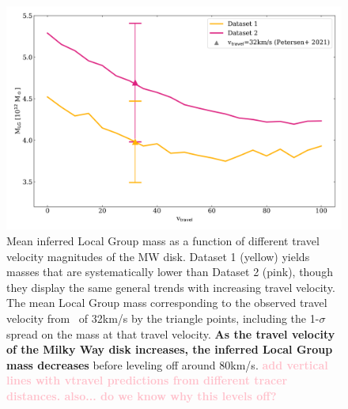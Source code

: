 \documentclass[twocolumn]{aastex631}
\newcommand{\kc}[1]{\textcolor{pink}{\textbf{#1}} }
\begin{document}
\begin{figure}[htb]
    \centering
    \includegraphics[width=\columnwidth]{analyze-runs-MvV.png}
    \caption{\label{fig:mvsv} Mean inferred Local Group mass as a function of different travel velocity magnitudes of the MW disk. Dataset 1 (yellow) yields masses that are systematically lower than Dataset 2 (pink), though they display the same general trends with increasing travel velocity. 
    The mean Local Group mass corresponding to the observed travel velocity from~\cite{Petersen2021} of 32km/s by the triangle points, including the 1-$\sigma$ spread on the mass at that travel velocity. \textbf{As the travel velocity of the Milky Way disk increases, the inferred Local Group mass decreases} before leveling off around 80km/s. 
     \kc{add vertical lines with vtravel predictions from different tracer distances. also... do we know why this levels off?}
    }
  \end{figure}
\end{document}
